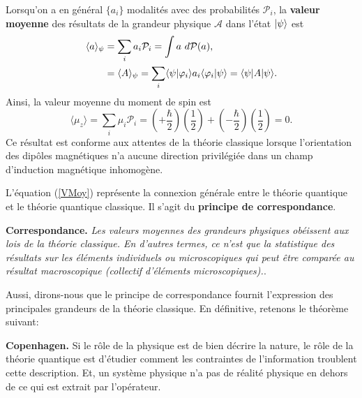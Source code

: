 \begin{example}
\end{example}

Lorsqu'on a en général $\{a_{i}\}$ modalités avec des probabilités
$\mathcal{P}_{i}$, la \textbf{valeur moyenne} des résultats de la grandeur
physique $\mathcal{A}$ dans l'état $\vert\psi\rangle$ est
\begin{subequations}%
\label{VMoy}%
\begin{align}
\langle a\rangle_{\psi}  &  =\sum_{i}a_{i}\mathcal{P}_{i}=\int
a~d\mathcal{P}(a),\\
&  =\langle A\rangle_{\psi}=\sum_{i}\langle\psi\vert\varphi_{i}\rangle
a_{i}\langle\varphi_{i}\vert\psi\rangle=\langle\psi|A|\psi\rangle.
\end{align}%
\end{subequations}%
Ainsi, la valeur moyenne du moment de spin est
\begin{equation}
\langle \mu_{z}\rangle =\sum_{i}\mu_{i}\mathcal{P}_{i}=\left(
+\frac{\hbar}{2}\right)  \left(  \frac{1}{2}\right)  +\left(  -\frac{\hbar}%
{2}\right)  \left(  \frac{1}{2}\right)  =0.
\end{equation}
Ce résultat est conforme aux attentes de la théorie classique lorsque
l'orientation des dipôles magnétiques n'a aucune direction privilégiée dans un
champ d'induction magnétique inhomogène.

L'équation (\ref{VMoy}) représente la connexion générale entre le
théorie quantique et le théorie quantique classique. Il s'agit du
\textbf{principe de correspondance}.


\medskip\colorbox[gray]{0.8}{
\parbox[c]{0.9\textwidth}{
\begin{principe}
\textbf{Correspondance.}\emph{ Les valeurs moyennes des grandeurs physiques
obéissent aux lois de la théorie classique. En d'autres termes, ce n'est que la
statistique des résultats sur les éléments individuels ou microscopiques qui
peut être comparée au résultat macroscopique (collectif d'éléments
microscopiques).}.
\end{principe}
}}\medskip

Aussi, dirons-nous que le principe de correspondance fournit l'expression des
principales grandeurs de la théorie classique. En définitive, retenons le
théorème suivant:

\medskip\colorbox[gray]{0.8}{
\parbox[c]{0.9\textwidth}{
\begin{theorem}
\textbf{Copenhagen.} Si le rôle de la physique est de bien décrire la nature, le
rôle de la théorie quantique est d'étudier comment les contraintes de
l'information troublent cette description. Et, un système physique n'a pas de
réalité physique en dehors de ce qui est extrait par l'opérateur.
\end{theorem}
}}\medskip

